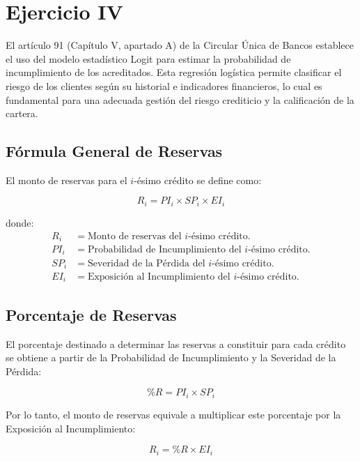 \section{Ejercicio IV}

El artículo 91 (Capítulo V, apartado A) de la Circular Única de Bancos establece el uso del modelo estadístico Logit para estimar la probabilidad de incumplimiento de los acreditados. Esta regresión logística permite clasificar el riesgo de los clientes según su historial e indicadores financieros, lo cual es fundamental para una adecuada gestión del riesgo crediticio y la calificación de la cartera.

\subsection{Fórmula General de Reservas}

El monto de reservas para el $i$-ésimo crédito se define como:

\begin{equation}
    R_i = PI_i \times SP_i \times EI_i
\end{equation}

\noindent donde:
\begin{align*}
    R_i  &= \text{Monto de reservas del } i\text{-ésimo crédito.} \\
    PI_i &= \text{Probabilidad de Incumplimiento del } i\text{-ésimo crédito.} \\
    SP_i &= \text{Severidad de la Pérdida del } i\text{-ésimo crédito.} \\
    EI_i &= \text{Exposición al Incumplimiento del } i\text{-ésimo crédito.}
\end{align*}

\subsection{Porcentaje de Reservas}

El porcentaje destinado a determinar las reservas a constituir para cada crédito se obtiene a partir de la Probabilidad de Incumplimiento y la Severidad de la Pérdida:

\begin{equation}
    \%R = PI_i \times SP_i
\end{equation}

Por lo tanto, el monto de reservas equivale a multiplicar este porcentaje por la Exposición al Incumplimiento:

\begin{equation}
    R_i = \%R \times EI_i
\end{equation}

